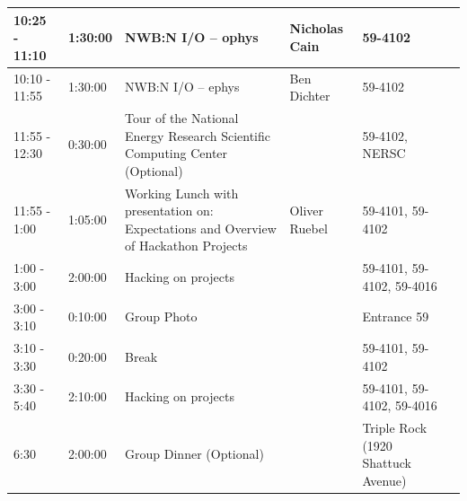 \documentclass{article}
\begin{document}
\begin{table}[h!]
\begin{tabular}{|l|l|p{6cm}|p{2cm}|p{1.5cm}|l|}
10:25 - 11:10     & 1:30:00           & NWB:N I/O – ophys                                                                              & Nicholas Cain               & 59-4102                                     & \cellcolor{yellow!}   \\ \hline
10:10 - 11:55     & 1:30:00           & NWB:N I/O – ephys                                                                              & Ben Dichter              & 59-4102                                     & \cellcolor{yellow!}   \\ \hline
11:55  - 12:30    & 0:30:00           & Tour of the National Energy Research Scientific Computing Center (Optional)            &                          & 59-4102, NERSC                              & \cellcolor{gray!25}\\ \hline
11:55 - 1:00      & 1:05:00           & Working Lunch with presentation on: Expectations and Overview of Hackathon Projects            & Oliver Ruebel            & 59-4101, 59-4102                            & \cellcolor{gray!25} \\ \hline
1:00 - 3:00       & 2:00:00           & Hacking on projects                                                                            &                          & 59-4101, 59-4102, 59-4016                   & \cellcolor{lime} \\ \hline                    
3:00 - 3:10    & 0:10:00              & Group Photo                                                                                    &                          & Entrance 59                                 & \cellcolor{gray!25}  \\ \hline
3:10 - 3:30       & 0:20:00           & Break                                                                                          &                          & 59-4101, 59-4102                            & \cellcolor{gray!25}  \\ \hline
3:30 - 5:40       & 2:10:00           & Hacking on projects                                                                            &                          & 59-4101, 59-4102, 59-4016                   & \cellcolor{lime} \\ \hline  
6:30              & 2:00:00           & Group Dinner (Optional)                                                                        &                          & Triple Rock (1920 Shattuck Avenue) & \cellcolor{gray!25}  \\ \hline
\end{tabular}
\end{table}
\end{document}
